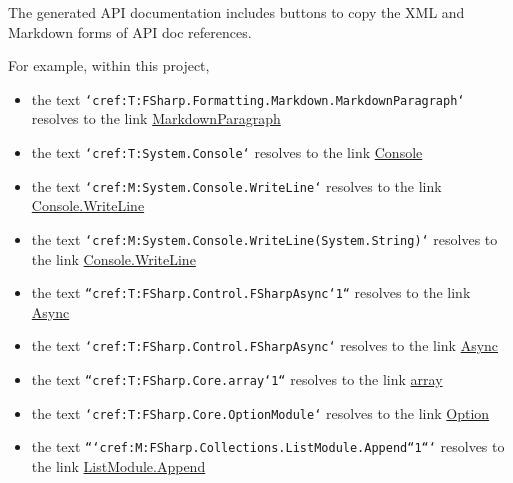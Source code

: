 \documentclass{article}
\begin{document}
The generated API documentation includes buttons to copy the XML and Markdown forms of API doc references.


For example, within this project,
\begin{itemize}
\item 

the text \texttt{`cref:T:FSharp.Formatting.Markdown.MarkdownParagraph`} resolves to the link \href{./reference/fsharp-formatting-markdown-markdownparagraph.html}{MarkdownParagraph}

\item 

the text \texttt{`cref:T:System.Console`} resolves to the link \href{https://learn.microsoft.com/dotnet/api/system.console}{Console}

\item 

the text \texttt{`cref:M:System.Console.WriteLine`} resolves to the link \href{https://learn.microsoft.com/dotnet/api/system.console.writeline}{Console.WriteLine}

\item 

the text \texttt{`cref:M:System.Console.WriteLine(System.String)`} resolves to the link \href{https://learn.microsoft.com/dotnet/api/system.console.writeline}{Console.WriteLine}

\item 

the text \texttt{``cref:T:FSharp.Control.FSharpAsync`1``} resolves to the link \href{https://fsharp.github.io/fsharp-core-docs/reference/fsharp-control-fsharpasync-1}{Async}

\item 

the text \texttt{`cref:T:FSharp.Control.FSharpAsync`} resolves to the link \href{https://fsharp.github.io/fsharp-core-docs/reference/fsharp-control-fsharpasync}{Async}

\item 

the text \texttt{``cref:T:FSharp.Core.array`1``} resolves to the link \href{https://fsharp.github.io/fsharp-core-docs/reference/fsharp-core-array-1}{array}

\item 

the text \texttt{`cref:T:FSharp.Core.OptionModule`} resolves to the link \href{https://fsharp.github.io/fsharp-core-docs/reference/fsharp-core-optionmodule}{Option}

\item 

the text \texttt{```cref:M:FSharp.Collections.ListModule.Append``1```} resolves to the link \href{https://fsharp.github.io/fsharp-core-docs/reference/fsharp-collections-listmodule\#Append}{ListModule.Append}

\end{itemize}
\end{document}
